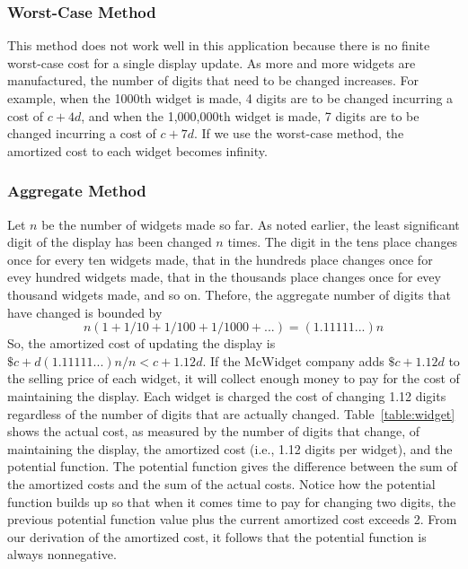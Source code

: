\subsubsection*{Worst-Case Method}
This method does not work well in this application
because there is no finite worst-case cost
for a single display update.  As more and more widgets are manufactured,
the number of digits that need to be changed increases.
For example, when the 1000th widget is made,
4 digits are to be changed incurring a cost
of $c + 4d$, and when the
1,000,000th widget is made,
7 digits are to be changed incurring a cost
of $c + 7d$.
If we use the worst-case method, the amortized cost to each widget
becomes infinity.

\subsubsection*{Aggregate Method}
Let $n$ be the number of widgets made so far.
As noted earlier, the least significant digit of the display has
been changed $n$ times.
The digit in the tens place changes once for every ten widgets
made, that in the hundreds place changes once for evey hundred widgets made,
that in the thousands place changes once for evey thousand widgets made,
and so on.
Thefore, the aggregate number of digits that have changed is
bounded by
$$n(1 + 1/10 + 1/100 + 1/1000 + ...) = (1.11111...)n$$
So, the amortized cost of updating the display is
$\$c + d(1.11111...)n/n < c + 1.12d$.
If the McWidget company adds $\$c + 1.12d$
to the selling price of each widget, it will collect enough money to
pay for the cost of maintaining the display.
Each widget is charged the cost of changing 1.12 digits
regardless of the number of digits that are actually changed.
Table~\ref{table:widget} shows the actual cost,
as measured by the number of digits that
change, of maintaining the display, the amortized cost
(i.e., 1.12 digits per widget), and the potential
function. The potential
function gives the difference between the sum of the amortized costs and
the sum of the actual costs. Notice how the potential function builds up so that
when it comes time to pay for changing two digits, the previous
potential function value
plus the current amortized cost exceeds 2. From
our derivation of the amortized cost, it follows that the potential function
is always nonnegative.

